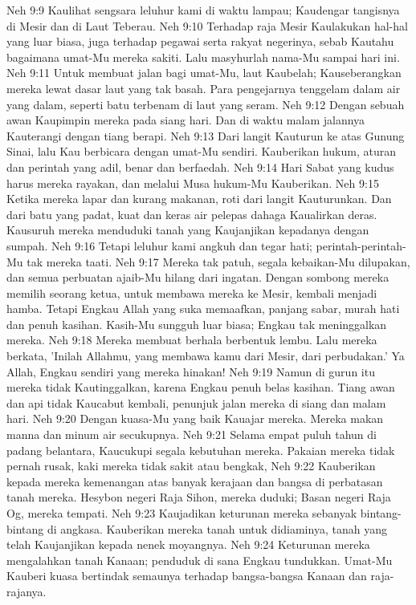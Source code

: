 Neh 9:9  Kaulihat sengsara leluhur kami di waktu lampau; Kaudengar tangisnya di Mesir dan di Laut Teberau.
Neh 9:10  Terhadap raja Mesir Kaulakukan hal-hal yang luar biasa, juga terhadap pegawai serta rakyat negerinya, sebab Kautahu bagaimana umat-Mu mereka sakiti. Lalu masyhurlah nama-Mu sampai hari ini.
Neh 9:11  Untuk membuat jalan bagi umat-Mu, laut Kaubelah; Kauseberangkan mereka lewat dasar laut yang tak basah. Para pengejarnya tenggelam dalam air yang dalam, seperti batu terbenam di laut yang seram.
Neh 9:12  Dengan sebuah awan Kaupimpin mereka pada siang hari. Dan di waktu malam jalannya Kauterangi dengan tiang berapi.
Neh 9:13  Dari langit Kauturun ke atas Gunung Sinai, lalu Kau berbicara dengan umat-Mu sendiri. Kauberikan hukum, aturan dan perintah yang adil, benar dan berfaedah.
Neh 9:14  Hari Sabat yang kudus harus mereka rayakan, dan melalui Musa hukum-Mu Kauberikan.
Neh 9:15  Ketika mereka lapar dan kurang makanan, roti dari langit Kauturunkan. Dan dari batu yang padat, kuat dan keras air pelepas dahaga Kaualirkan deras. Kausuruh mereka menduduki tanah yang Kaujanjikan kepadanya dengan sumpah.
Neh 9:16  Tetapi leluhur kami angkuh dan tegar hati; perintah-perintah-Mu tak mereka taati.
Neh 9:17  Mereka tak patuh, segala kebaikan-Mu dilupakan, dan semua perbuatan ajaib-Mu hilang dari ingatan. Dengan sombong mereka memilih seorang ketua, untuk membawa mereka ke Mesir, kembali menjadi hamba. Tetapi Engkau Allah yang suka memaafkan, panjang sabar, murah hati dan penuh kasihan. Kasih-Mu sungguh luar biasa; Engkau tak meninggalkan mereka.
Neh 9:18  Mereka membuat berhala berbentuk lembu. Lalu mereka berkata, 'Inilah Allahmu, yang membawa kamu dari Mesir, dari perbudakan.' Ya Allah, Engkau sendiri yang mereka hinakan!
Neh 9:19  Namun di gurun itu mereka tidak Kautinggalkan, karena Engkau penuh belas kasihan. Tiang awan dan api tidak Kaucabut kembali, penunjuk jalan mereka di siang dan malam hari.
Neh 9:20  Dengan kuasa-Mu yang baik Kauajar mereka. Mereka makan manna dan minum air secukupnya.
Neh 9:21  Selama empat puluh tahun di padang belantara, Kaucukupi segala kebutuhan mereka. Pakaian mereka tidak pernah rusak, kaki mereka tidak sakit atau bengkak,
Neh 9:22  Kauberikan kepada mereka kemenangan atas banyak kerajaan dan bangsa di perbatasan tanah mereka. Hesybon negeri Raja Sihon, mereka duduki; Basan negeri Raja Og, mereka tempati.
Neh 9:23  Kaujadikan keturunan mereka sebanyak bintang-bintang di angkasa. Kauberikan mereka tanah untuk didiaminya, tanah yang telah Kaujanjikan kepada nenek moyangnya.
Neh 9:24  Keturunan mereka mengalahkan tanah Kanaan; penduduk di sana Engkau tundukkan. Umat-Mu Kauberi kuasa bertindak semaunya terhadap bangsa-bangsa Kanaan dan raja-rajanya.
